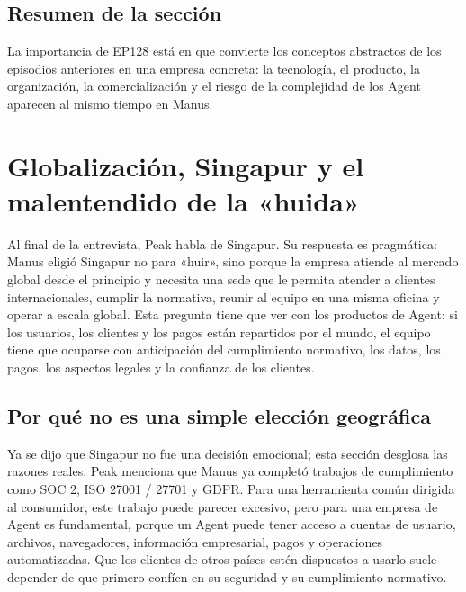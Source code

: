 \documentclass[a4paper]{article}
\begin{document}
\subsection{Resumen de la sección}

La importancia de EP128 está en que convierte los conceptos abstractos de los episodios anteriores en una empresa concreta: la tecnología, el producto, la organización, la comercialización y el riesgo de la complejidad de los Agent aparecen al mismo tiempo en Manus.
\section{Globalización, Singapur y el malentendido de la «huida»}

Al final de la entrevista, Peak habla de Singapur. Su respuesta es pragmática: Manus eligió Singapur no para «huir», sino porque la empresa atiende al mercado global desde el principio y necesita una sede que le permita atender a clientes internacionales, cumplir la normativa, reunir al equipo en una misma oficina y operar a escala global. Esta pregunta tiene que ver con los productos de Agent: si los usuarios, los clientes y los pagos están repartidos por el mundo, el equipo tiene que ocuparse con anticipación del cumplimiento normativo, los datos, los pagos, los aspectos legales y la confianza de los clientes.

\subsection{Por qué no es una simple elección geográfica}

Ya se dijo que Singapur no fue una decisión emocional; esta sección desglosa las razones reales. Peak menciona que Manus ya completó trabajos de cumplimiento como SOC 2, ISO 27001 / 27701 y GDPR. Para una herramienta común dirigida al consumidor, este trabajo puede parecer excesivo, pero para una empresa de Agent es fundamental, porque un Agent puede tener acceso a cuentas de usuario, archivos, navegadores, información empresarial, pagos y operaciones automatizadas. Que los clientes de otros países estén dispuestos a usarlo suele depender de que primero confíen en su seguridad y su cumplimiento normativo.
\end{document}
